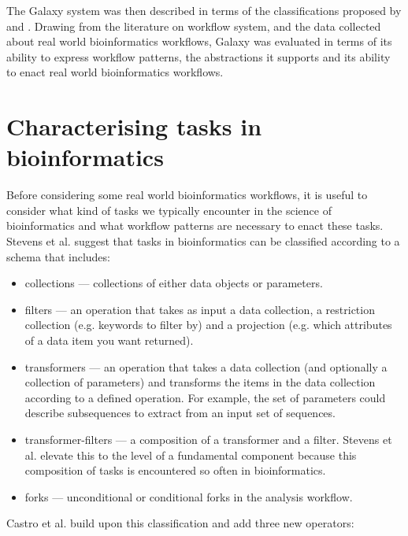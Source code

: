 \documentclass[a4paper,10pt]{scrreprt}
\begin{document}
The Galaxy system was then described in terms of the classifications proposed by \cite{yu_taxonomy_2005} and \cite{deelman_workflows_2009}. Drawing from the literature on workflow system, and the data collected about real world bioinformatics workflows, Galaxy was evaluated in terms of its ability to express workflow patterns, the abstractions it supports and its ability to enact real world bioinformatics workflows.

\section{Characterising tasks in bioinformatics}
\label{sec:tasksinbioinformatics}
Before considering some real world bioinformatics workflows, it is useful to consider what kind of tasks we typically encounter in the science of bioinformatics and what workflow patterns are necessary to enact these tasks. Stevens et al. \cite{stevens_classification_2001} suggest that tasks in bioinformatics can be classified according to a schema that includes:

\begin{itemize}

\item collections --- collections of either data objects or parameters.

\item filters --- an operation that takes as input a data collection, a restriction collection (e.g. keywords to filter by) and a projection (e.g. which attributes of a data item you want returned).

\item transformers --- an operation that takes a data collection (and optionally a collection of parameters) and transforms the items in the data collection according to a defined operation. For example, the set of parameters could describe subsequences to extract from an input set of sequences.

\item transformer-filters --- a composition of a transformer and a filter. Stevens et al. elevate this to the level of a fundamental component because this composition of tasks is encountered so often in bioinformatics.

\item forks --- unconditional or conditional forks in the analysis workflow.

\end{itemize}

Castro et al. \cite{castro_workflows_2005} build upon this classification and add three new operators:
\end{document}
